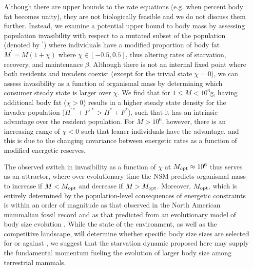 \documentclass{pnastwo}
\begin{document}
\begin{article}
Although there are upper bounds to the rate equations (e.g. when percent body fat becomes unity), they are not biologically feasible and we do not discuss them further.
Instead, we examine a potential upper bound to body mass by assessing population invasibility with respect to a mutated subset of the population (denoted by ${}^\prime$) where individuals have a modified proportion of body fat $M^\prime=M(1+\chi)$ where $\chi \in [-0.5,0.5]$, thus altering rates of starvation, recovery, and maintenance $\beta$.
Although there is not an internal fixed point where both residents and invaders coexist (except for the trivial state $\chi=0$), we can assess invasibility as a function of organismal mass by determining which consumer steady state is larger over $\chi$.
We find that for $1\leq M<10^6$g, having additional body fat ($\chi > 0$) results in a higher steady state density for the invader population ($H^{\prime *}+F^{\prime *}>H^*+F^*$), such that it has an intrinsic advantage over the resident population.
For $M>10^6$, however, there is an increasing range of $\chi < 0$ such that leaner individuals have the advantage, and this is due to the changing covariance between energetic rates as a function of modified energetic reserves.

The observed switch in invasibility as a function of $\chi$ at $M_{\rm opt}\approx10^6$ thus serves as an attractor, where over evolutionary time the NSM predicts organismal mass to increase if $M<M_{\rm opt}$ and decrease if $M>M_{\rm opt}$.
Moreover, $M_{\rm opt}$, which is entirely determined by the population-level consequences of energetic constraints is within an order of magnitude as that observed in the North American mammalian fossil record \cite{Alroy:1998p1594} and as that predicted from an evolutionary model of body size evolution \cite{Clauset:2009fh}.
While the state of the environment, as well as the competitive landscape, will determine whether specific body size sizes are selected for or against \cite{Saarinen:2014br}, we suggest that the starvation dynamic proposed here may supply the fundamental momentum fueling the evolution of larger body size among terrestrial mammals.


\end{article}
\end{document}
